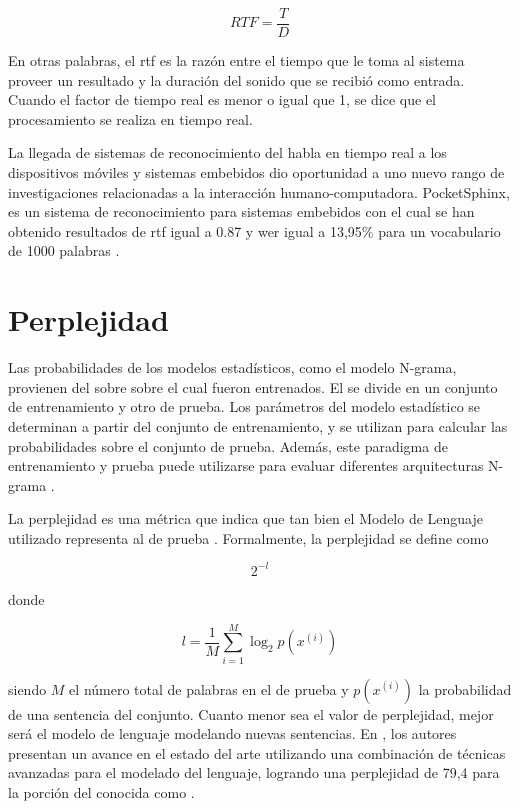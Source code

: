 \begin{equation}
\label{eq:rtf}
    RTF = \frac{T}{D}
\end{equation}

En otras palabras, el \gls{rtf} es la razón entre el tiempo que le toma al sistema proveer un resultado y la
duración del sonido que se recibió como entrada. Cuando el factor de tiempo real es menor o igual que 1, 
se dice que el procesamiento se realiza en tiempo real.

La llegada de sistemas de reconocimiento del habla en tiempo real a los dispositivos m\'oviles y sistemas embebidos dio
oportunidad a uno nuevo rango de investigaciones relacionadas a la interacci\'on humano-computadora. PocketSphinx, es
un sistema de reconocimiento para sistemas embebidos con el cual se han obtenido resultados de \gls{rtf} igual a 0.87 
y \gls{wer} igual a 13,95\% para un vocabulario de 1000 palabras \cite{HugginsDainesPocketSphinx2006}.

\section{Perplejidad}
\label{sec:perplexity}

Las probabilidades de los modelos estad\'isticos, como el modelo N-grama, provienen del  sobre
sobre el cual fueron entrenados. El  se divide en un conjunto de entrenamiento y otro de prueba.
Los par\'ametros del modelo estad\'istico se determinan a partir del conjunto de entrenamiento, y se utilizan
para calcular las probabilidades sobre el conjunto de prueba. Adem\'as, este paradigma de entrenamiento y prueba
puede utilizarse para evaluar diferentes arquitecturas N-grama \cite{Jurafsky}.

La perplejidad es una m\'etrica que indica que tan bien el Modelo de Lenguaje utilizado representa al  
de prueba \cite{RosenfeldStatistical1997}. Formalmente, la perplejidad se define como

\begin{equation*}
    2^{-l}
\end{equation*}

donde

\begin{equation*}
    l = \frac{1}{M}\sum_{i=1}^{M}\log_2p(x^{(i)})
\end{equation*}

siendo $M$ el n\'umero total de palabras en el  de prueba y $p(x^{(i)})$ la probabilidad de una 
sentencia del conjunto. Cuanto menor sea el valor de perplejidad, mejor ser\'a el modelo de lenguaje modelando
nuevas sentencias. En \cite{MikolovEmpirical2011}, los autores presentan un avance en el estado del arte
utilizando una combinaci\'on de t\'ecnicas avanzadas para el modelado del lenguaje, logrando una perplejidad
de 79,4 para la porci\'on del  conocida como .
